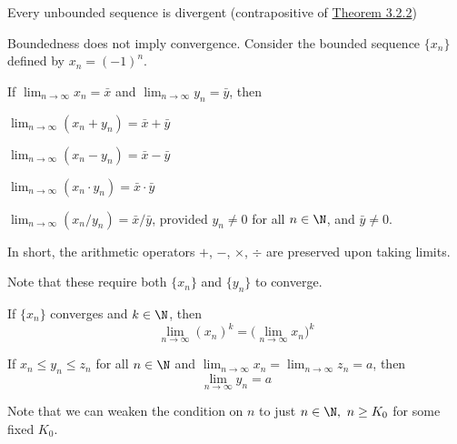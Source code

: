 \label{a46c1d7}

\begin{enumerati}
  \item Every unbounded sequence is divergent (contrapositive of \href{d8148e6}{Theorem
  3.2.2})
  \item Boundedness does not imply convergence. Consider the bounded sequence $\{x_n\}$
  defined by $x_n=(-1)^n$.
\end{enumerati}

\label{d13a5e7}

If $\displaystyle\lim_{n\to\infty}x_n=\bar x$ and
$\displaystyle\lim_{n\to\infty}y_n=\bar y$, then

\begin{enumerati}
  \def\l{\displaystyle\lim_{n\to\infty}}
  \item $\l(x_n+y_n)=\bar x+\bar y$
  \item $\l(x_n-y_n)=\bar x-\bar y$
  \item $\l(x_n\cdot y_n)=\bar x\cdot\bar y$
  \item $\l(x_n/y_n)=\bar x/\bar y$, provided $y_n\neq0$ for all $n\in\N$, and
  $\bar y\neq0$.
\end{enumerati}

In short, the arithmetic operators $+$, $-$, $\times$, $\div$ are preserved
upon taking limits.

Note that these require both $\{x_n\}$ and $\{y_n\}$ to converge.

\label{c182ece}

If $\{x_n\}$ converges and $k\in\N$, then
$$
  \lim_{n\to\infty} (x_n)^k=\Big(\lim_{n\to\infty}x_n\Big)^k
$$

\label{c3364d9}

If $x_n\leq y_n\leq z_n$ for all $n\in\N$ and
$\displaystyle\lim_{n\to\infty}x_n=\lim_{n\to\infty}z_n=a$, then
$$
  \lim_{n\to\infty}y_n=a
$$

Note that we can weaken the condition on $n$ to just $n\in\N,\ n\geq K_0$ for
some fixed $K_0$.

